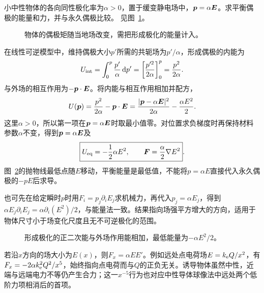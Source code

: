 \begin{exercise}[受诱导的小球]\label{ex:es1-h8}
小中性物体的各向同性极化率为$\alpha>0$，置于缓变静电场中，$\bm{p}=\alpha\bm{E}$。求平衡偶极的能量和力，并与永久偶极比较。 见图~\ref{fig:es1-h8-q}。
\end{exercise}

\begin{figure}[H]\centering
{}
\caption{物体的偶极矩随当地场改变，需把形成极化的能量计入。}\label{fig:es1-h8-q}
\end{figure}
\begin{solution}
在线性可逆模型中，维持偶极大小$p'$所需的共轭场为$p'/\alpha$，形成偶极的内能为
\[U_{\rm int}=\int_0^p\frac{p'}\alpha\mathop{}\!\mathrm d p'
=\left[\frac{p'^2}{2\alpha}\right]_0^p=\frac{p^2}{2\alpha}.\]
与外场的相互作用为$-\bm{p}\cdot\bm{E}$。将内能与相互作用相加并配方，
\[U(\bm{p})=\frac{p^2}{2\alpha}-\bm{p}\cdot\bm{E}
=\frac{|\bm{p}-\alpha\bm{E}|^2}{2\alpha}-\frac{\alpha E^2}{2}.
\]
这里$\alpha>0$，所以第一项在$\bm{p}=\alpha\bm{E}$时取最小值零。对位置求负梯度时再保持材料参数$\alpha$不变，得到$\bm{p}=\alpha\bm{E}$及
\[\boxed{U_{\rm eq}=-\frac12\alpha E^2,\qquad
\bm{F}=\frac\alpha2\nabla E^2}.\]
图~\ref{fig:es1-h8-s}的抛物线最低点随$E$移动，平衡能量是最低值，不能将$p=\alpha E$直接代入永久偶极的$-pE$后求导。

也可先在给定瞬时$p$时用$F_i=p_j\partial_iE_j$求机械力，再代入$p_j=\alpha E_j$，得到$\alpha E_j\partial_iE_j=\alpha\partial_i(E^2)/2$，与能量法一致。结果指向场强平方增大的方向，适用于物体尺寸小于场变化尺度且无不可逆极化的范围。
\begin{figure}[H]\centering
{}
\caption{形成极化的正二次能与外场作用能相加，最低能量为$-\alpha E^2/2$。}\label{fig:es1-h8-s}
\end{figure}


若沿$x$方向的场大小为$E(x)$，则$F_x=\alpha E E'$。例如远处点电荷场$E=k_{\rm e} Q/x^2$，有$F_x=-2\alpha k_{\rm e}^2Q^2/x^5$，始终指向点电荷而与$Q$的正负无关。诱导物体虽然中性，近端与远端电力不等仍产生合力；这一$x^{-5}$行为也对应中性导体球像法中远处两个低阶力项相消后的首项。
\end{solution}

